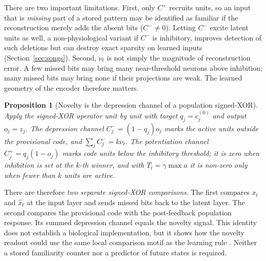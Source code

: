 \documentclass[11pt,a4paper]{article}
\newtheorem{proposition}{Proposition}
\begin{document}
There are two important limitations. First, only $C^+$ recruits units, so an input that is \emph{missing} part of a stored pattern may be identified as familiar if the reconstruction merely adds the absent bits ($C^-\ne0$). Letting $C^-$ excite latent units as well, a non-physiological variant if $C^-$ is inhibitory, improves detection of such deletions but can destroy exact sparsity on learned inputs (Section~\ref{sec:songs}). Second, $\nu_t$ is not simply the magnitude of reconstruction error. A few missed bits may bring many near-threshold neurons above inhibition; many missed bits may bring none if their projections are weak. The learned geometry of the encoder therefore matters.

\begin{proposition}[Novelty is the depression channel of a population signed-XOR]\label{prop:sxor}
Apply the signed-XOR operator \citep{pena2026motif,pena2026loss} unit by unit with target $q_j=c^{(0)}_j$ and output $o_j=z_j$. The depression channel $C^-_j=(1-q_j)o_j$ marks the active units outside the provisional code, and $\sum_jC^-_j=k\nu_t$. The potentiation channel $C^+_j=q_j(1-o_j)$ marks code units below the inhibitory threshold; it is zero when inhibition is set at the $k$-th winner, and with $T_t=\gamma\max a$ it is non-zero only when fewer than $k$ units are active.
\end{proposition}

There are therefore \emph{two separate signed-XOR comparisons}. The first compares $x_t$ and $\hat x_t$ at the input layer and sends missed bits back to the latent layer. The second compares the provisional code with the post-feedback population response. Its summed depression channel equals the novelty signal. This identity does not establish a biological implementation, but it shows how the novelty readout could use the same local comparison motif as the learning rule \citep{pena2026motif}. Neither a stored familiarity counter nor a predictor of future states is required.
\end{document}
